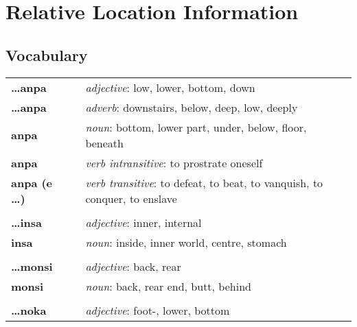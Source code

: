 
\section{Relative Location Information}
\subsection*{Vocabulary}

\begin{supertabular}{p{2,5cm}|ll}
    \textbf{\dots anpa}     &  & \textit{adjective}: low, lower, bottom, down                                      \\
    \textbf{\dots anpa}     &  & \textit{adverb}: downstairs, below, deep, low, deeply                             \\
    \textbf{anpa}           &  & \textit{noun}: bottom, lower part, under, below, floor, beneath                   \\
    \textbf{anpa}           &  & \textit{verb intransitive}: to prostrate oneself                                  \\
    \textbf{anpa (e \dots)} &  & \textit{verb transitive}: to defeat, to beat, to vanquish, to conquer, to enslave \\
                            &  &                                                                                   \\
    \textbf{\dots insa}     &  & \textit{adjective}: inner, internal                                               \\
    \textbf{insa}           &  & \textit{noun}: inside, inner world, centre, stomach                               \\
                            &  &                                                                                   \\
    \textbf{\dots monsi}    &  & \textit{adjective}: back, rear                                                    \\
    \textbf{monsi}          &  & \textit{noun}: back, rear end, butt, behind                                       \\
                            &  &                                                                                   \\
    \textbf{\dots noka}     &  & \textit{adjective}: foot-, lower, bottom                                          \\

\end{supertabular}
